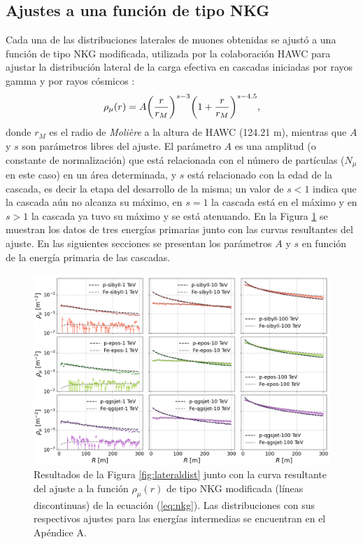 	\subsection{Ajustes a una funci\'on de tipo NKG}
	Cada una de las distribuciones laterales de muones obtenidas se ajust\'o a una funci\'on de tipo NKG modificada, utilizada por la colaboraci\'on HAWC para ajustar la distribuci\'on lateral de la carga efectiva en cascadas iniciadas por rayos gamma	\cite{Malone2018} y por rayos c\'osmicos \cite{Morales-Soto2019}:
	\begin{align} \label{eq:nkg}
	\rho_{\mu}(r) = A \qty(\frac{r}{r_M})^{s-3}\qty(1+\frac{r}{r_M})^{s-4.5},
	\end{align}
	donde $r_M$ es el radio de \textit{Moli\`ere} a la altura de HAWC (124.21 m), mientras que $A$ y $s$ son par\'ametros libres del ajuste. El par\'ametro $A$ es una amplitud (o constante de normalizaci\'on) que est\'a relacionada con el n\'umero de part\'iculas ($N_{\mu}$ en este caso) en un \'area determinada, y $s$ est\'a relacionado con la edad de la cascada, es decir la etapa del desarrollo de la misma; un valor de $s<1$ indica que la cascada a\'un no alcanza su m\'aximo, en $s=1$ la cascada est\'a en el m\'aximo y en $s>1$ la cascada ya tuvo su m\'aximo y se est\'a atenuando. En la Figura \ref{fig:lateraldist_wfits} se muestran los datos de tres energ\'ias primarias junto con las curvas resultantes del ajuste. En las siguientes secciones se presentan los par\'ametros $A$ y $s$ en funci\'on de la energ\'ia primaria de las cascadas.\\
		\begin{figure}[] 
		\includegraphics[width=\textwidth]{Figuras/lateraldist_wfits}
		\caption{Resultados de la Figura \ref{fig:lateraldist} junto con la curva resultante del ajuste a la funci\'on $\rho_{\mu}(r)$ de tipo NKG modificada (l\'ineas discontinuas) de la ecuaci\'on (\ref{eq:nkg}). Las distribuciones con sus respectivos ajustes para las energ\'ias intermedias se encuentran en el Ap\'endice A.}
		\label{fig:lateraldist_wfits}
		\end{figure}
		
